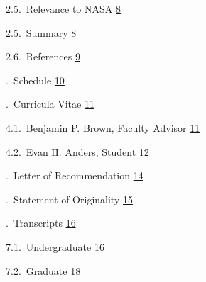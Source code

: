 \documentclass[12pt]{article}
\begin{document}
\vspace*{0.06in}
\noindent\hspace*{0.25in}
2.5.$\,$ Relevance to NASA
\dotfill \hyperlink{page.8}{8}

\vspace*{0.06in}
\noindent\hspace*{0.25in}
2.5.$\,$ Summary
\dotfill \hyperlink{page.8}{8}

\vspace*{0.06in}
\noindent\hspace*{0.25in}
2.6.$\,$ References
\dotfill \hyperlink{page.9}{9}

\vspace*{0.06in}
.$\,$ Schedule
\dotfill \hyperlink{page.10}{10}

\vspace*{0.06in}
.$\,$ Curricula Vitae
\dotfill \hyperlink{page.11}{11}

\vspace*{0.06in}
\noindent\hspace*{0.25in}
4.1.$\,$ Benjamin P. Brown, Faculty Advisor
\dotfill \hyperlink{page.11}{11}

\vspace*{0.06in}
\noindent\hspace*{0.25in}
4.2.$\,$ Evan H. Anders, Student
\dotfill \hyperlink{page.12}{12}

\vspace*{0.06in}
.$\,$ Letter of Recommendation
\dotfill \hyperlink{page.14}{14}

\vspace*{0.06in}
.$\,$ Statement of Originality
\dotfill \hyperlink{page.15}{15}

\vspace*{0.06in}
.$\,$ Transcripts
\dotfill \hyperlink{page.16}{16}

\vspace*{0.06in}
\noindent\hspace*{0.25in}
7.1.$\,$ Undergraduate
\dotfill \hyperlink{page.16}{16}

\vspace*{0.06in}
\noindent\hspace*{0.25in}
7.2.$\,$ Graduate
\dotfill \hyperlink{page.18}{18}

\newpage
{}


\newpage
{}

\end{document}
